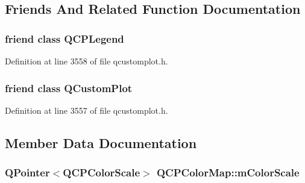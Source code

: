 \subsection{Friends And Related Function Documentation}
\hypertarget{class_q_c_p_color_map_a8429035e7adfbd7f05805a6530ad5e3b}{}
\subsubsection[{Q\+C\+P\+Legend}]{\setlength{\rightskip}{0pt plus 5cm}friend class {\bf Q\+C\+P\+Legend}\hspace{0.3cm}{\ttfamily [friend]}}\label{class_q_c_p_color_map_a8429035e7adfbd7f05805a6530ad5e3b}


Definition at line 3558 of file qcustomplot.\+h.

\hypertarget{class_q_c_p_color_map_a1cdf9df76adcfae45261690aa0ca2198}{}
\subsubsection[{Q\+Custom\+Plot}]{\setlength{\rightskip}{0pt plus 5cm}friend class {\bf Q\+Custom\+Plot}\hspace{0.3cm}{\ttfamily [friend]}}\label{class_q_c_p_color_map_a1cdf9df76adcfae45261690aa0ca2198}


Definition at line 3557 of file qcustomplot.\+h.



\subsection{Member Data Documentation}
\hypertarget{class_q_c_p_color_map_a95b4100bacc3387652c988b071ec9db7}{}
\subsubsection[{m\+Color\+Scale}]{\setlength{\rightskip}{0pt plus 5cm}Q\+Pointer$<${\bf Q\+C\+P\+Color\+Scale}$>$ Q\+C\+P\+Color\+Map\+::m\+Color\+Scale\hspace{0.3cm}{\ttfamily [protected]}}\label{class_q_c_p_color_map_a95b4100bacc3387652c988b071ec9db7}


